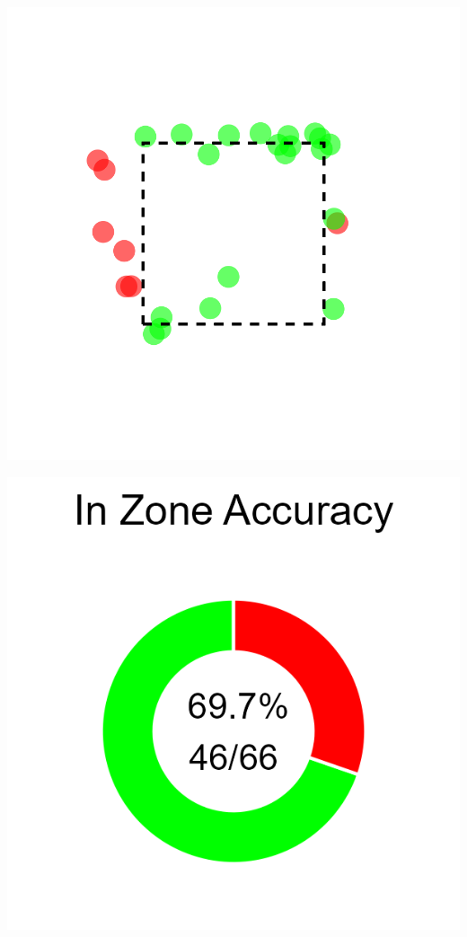 \documentclass[
]{article}
\begin{document}
\begin{center}
\begin{minipage}[t]{0.3\textwidth}
\centering
\includegraphics{plots/missed_calls.png}
\end{minipage}
\hfill
\begin{minipage}[t]{0.2\textwidth}
\centering

\includegraphics{plots/iz_accuracy.png}
\end{minipage}
\hfill
\begin{minipage}[t]{0.2\textwidth}
\centering


\end{minipage}
\end{center}
\end{document}
